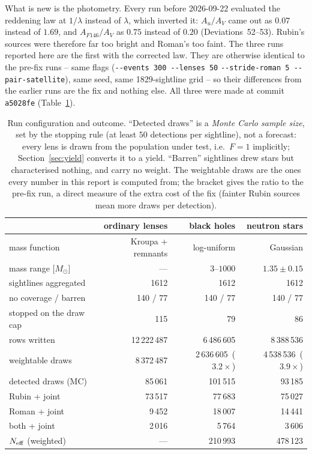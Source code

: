 \documentclass[english,10pt,a4paper]{article}
\newcommand{\Msun}{M_\odot}
\newcommand{\Neff}{N_{\rm eff}}
\begin{document}
What is new is the photometry. Every run before 2026-09-22 evaluated the \citet{Cardelli1989}
reddening law at $1/\lambda$ instead of $\lambda$, which inverted it: $A_u/A_V$ came out as $0.07$
instead of $1.69$, and $A_{F146}/A_V$ as $0.75$ instead of $0.20$ (Deviations~52--53). Rubin's
sources were therefore far too bright and Roman's too faint. The three runs reported here are the
first with the corrected law. They are otherwise identical to the pre-fix runs -- same flags
(\verb|--events 300 --lenses 50| \verb|--stride-roman 5 --pair-satellite|), same seed, same
1829-sightline grid -- so their differences from the earlier runs are the fix and nothing else.
All three were made at commit \texttt{a5028fe} (Table~\ref{tab:runs}).

\begin{table}[h]
\centering
\caption{Run configuration and outcome. ``Detected draws'' is a \emph{Monte Carlo sample size},
set by the stopping rule (at least $50$ detections per sightline), not a forecast: every lens is
drawn from the population under test, i.e.\ $F=1$ implicitly; Section~\ref{sec:yield} converts
it to a yield. ``Barren'' sightlines drew stars but characterised nothing, and carry no weight.
The weightable draws are the ones every number in this report is computed from; the bracket gives
the ratio to the pre-fix run, a direct measure of the extra cost of the fix (fainter Rubin sources
mean more draws per detection).}
\label{tab:runs}
\small
\begin{tabular}{lrrr}
\toprule
 & ordinary lenses & black holes & neutron stars \\
\midrule
mass function         & Kroupa + remnants & log-uniform & Gaussian \\
mass range [$\Msun$]  & ---               & $3$--$1000$ & $1.35\pm0.15$ \\
sightlines aggregated & 1612 & 1612 & 1612 \\
\quad no coverage / barren & 140 / 77 & 140 / 77 & 140 / 77 \\
\quad stopped on the draw cap & 115 & 79 & 86 \\
rows written          & 12\,222\,487 & 6\,486\,605 & 8\,388\,536 \\
weightable draws      & 8\,372\,487 & 2\,636\,605\ ($3.2\times$) & 4\,538\,536\ ($3.9\times$) \\
detected draws (MC)   & 85\,061 & 101\,515 & 93\,185 \\
\quad Rubin + joint     & 73\,517 & 77\,683 & 75\,027 \\
\quad Roman + joint     & 9\,452  & 18\,007 & 14\,441 \\
\quad both + joint      & 2\,016  & 5\,764  & 3\,606 \\
$\Neff$ (weighted)    & --- & 210\,993 & 478\,123 \\
\bottomrule
\end{tabular}
\end{table}
\end{document}

